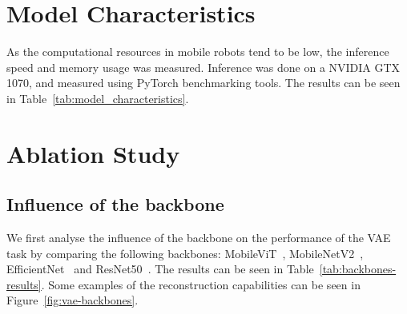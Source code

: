 \section{Model Characteristics}

As the computational resources in mobile robots tend to be low, the inference speed and memory usage was measured. Inference was done on a NVIDIA GTX 1070, and measured using PyTorch benchmarking tools. The results can be seen in Table~\ref{tab:model_characteristics}.




\section{Ablation Study}
\subsection{Influence of the backbone}
We first analyse the influence of the backbone on the performance of the VAE task by comparing the following backbones: MobileViT~\cite{Mehta2022SeparableSF}, MobileNetV2~\cite{sandler2019mobilenetv2invertedresidualslinear}, EfficientNet~\cite{tan2020efficientnetrethinkingmodelscaling} and ResNet50~\cite{he2015deep}. The results can be seen in Table~\ref{tab:backbones-results}. Some examples of the reconstruction capabilities can be seen in Figure~\ref{fig:vae-backbones}.

